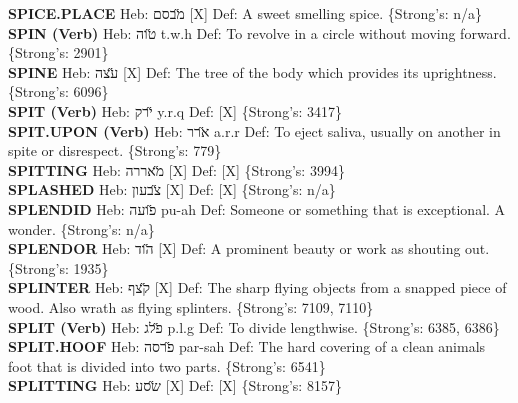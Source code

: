 {\textbf{SPICE.PLACE} Heb: {\large\H מבסם} {[}X{]} Def: A sweet smelling spice. \{Strong's: n/a\}\hfill{}\\

\textbf{SPIN (Verb)} Heb: {\large\H טוה} t.w.h Def: To revolve in a circle without moving forward. \{Strong's: 2901\}\hfill{}\\

\textbf{SPINE} Heb: {\large\H עצה} {[}X{]} Def: The tree of the body which provides its uprightness. \{Strong's: 6096\}\hfill{}\\

\textbf{SPIT (Verb)} Heb: {\large\H ירק} y.r.q Def: {[}X{]} \{Strong's: 3417\}\hfill{}\\

\textbf{SPIT.UPON (Verb)} Heb: {\large\H ארר} a.r.r Def: To eject saliva, usually on another in spite or disrespect. \{Strong's: 779\}\hfill{}\\

\textbf{SPITTING} Heb: {\large\H מאררה} {[}X{]} Def: {[}X{]} \{Strong's: 3994\}\hfill{}\\

\textbf{SPLASHED} Heb: {\large\H צבעון} {[}X{]} Def: {[}X{]} \{Strong's: n/a\}\hfill{}\\

\textbf{SPLENDID} Heb: {\large\H פועה} pu-ah Def: Someone or something that is exceptional. A wonder. \{Strong's: n/a\}\hfill{}\\

\textbf{SPLENDOR} Heb: {\large\H הוד} {[}X{]} Def: A prominent beauty or work as shouting out. \{Strong's: 1935\}\hfill{}\\

\textbf{SPLINTER} Heb: {\large\H קצף} {[}X{]} Def: The sharp flying objects from a snapped piece of wood. Also wrath as flying splinters. \{Strong's: 7109, 7110\}\hfill{}\\

\textbf{SPLIT (Verb)} Heb: {\large\H פלג} p.l.g Def: To divide lengthwise. \{Strong's: 6385, 6386\}\hfill{}\\

\textbf{SPLIT.HOOF} Heb: {\large\H פרסה} par-sah Def: The hard covering of a clean animals foot that is divided into two parts. \{Strong's: 6541\}\hfill{}\\

\textbf{SPLITTING} Heb: {\large\H שסע} {[}X{]} Def: {[}X{]} \{Strong's: 8157\}\hfill{}\\

}
